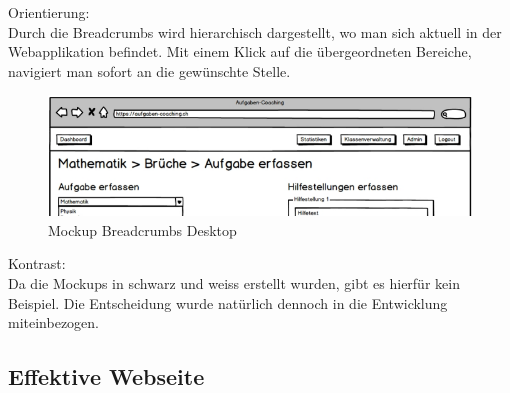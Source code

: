 Orientierung: \\
Durch die Breadcrumbs wird hierarchisch dargestellt, wo man sich aktuell in der Webapplikation befindet. Mit einem Klick auf die übergeordneten Bereiche, navigiert man sofort an die gewünschte Stelle. \\
\begin{minipage}{\textwidth}
	\begin{figure}[H]
	\centering
		\includegraphics[width=\textwidth, keepaspectratio]{images/Mockups/Breadcrumbs_Desktop.png}
		\caption{Mockup Breadcrumbs Desktop}
	\end{figure}
\end{minipage}


Kontrast: \\
Da die Mockups in schwarz und weiss erstellt wurden, gibt es hierfür kein Beispiel. Die Entscheidung wurde natürlich dennoch in die Entwicklung miteinbezogen.



\subsection{Effektive Webseite}

\newpage